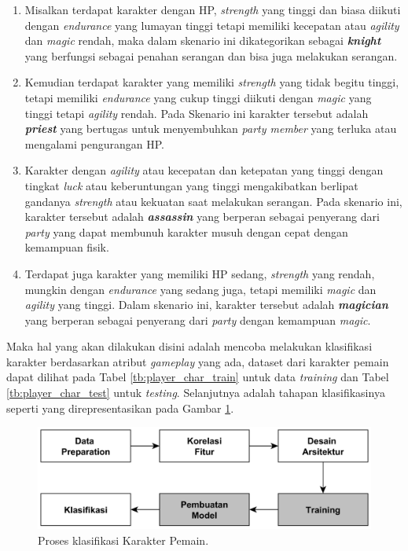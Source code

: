 \begin{enumerate}[label=\arabic*).]
	\item Misalkan terdapat karakter dengan HP, \textit{strength} yang tinggi dan biasa diikuti dengan \textit{endurance} yang lumayan tinggi tetapi memiliki kecepatan atau \textit{agility} dan \textit{magic} rendah, maka dalam skenario ini dikategorikan sebagai \textbf{\textit{knight}} yang berfungsi sebagai penahan serangan dan bisa juga melakukan serangan. 
	
	\item Kemudian terdapat karakter yang memiliki \textit{strength} yang tidak begitu tinggi, tetapi memiliki \textit{endurance} yang cukup tinggi diikuti dengan \textit{magic} yang tinggi tetapi \textit{agility} rendah. Pada Skenario ini karakter tersebut adalah \textbf{\textit{priest}} yang bertugas untuk menyembuhkan \textit{party member} yang terluka atau mengalami pengurangan HP. 
	
	\item Karakter dengan \textit{agility} atau kecepatan dan ketepatan yang tinggi dengan tingkat \textit{luck} atau keberuntungan yang tinggi mengakibatkan berlipat gandanya \textit{strength} atau kekuatan saat melakukan serangan. Pada skenario ini, karakter tersebut adalah \textbf{\textit{assassin}} yang berperan sebagai penyerang dari \textit{party} yang dapat membunuh karakter musuh dengan cepat dengan kemampuan fisik.
	
	\item Terdapat juga karakter yang memiliki HP sedang, \textit{strength} yang rendah, mungkin dengan \textit{endurance} yang sedang juga, tetapi memiliki \textit{magic} dan \textit{agility} yang tinggi. Dalam skenario ini, karakter tersebut adalah \textbf{\textit{magician}} yang berperan sebagai penyerang dari \textit{party} dengan kemampuan \textit{magic}.
\end{enumerate}

Maka hal yang akan dilakukan disini adalah mencoba melakukan klasifikasi karakter berdasarkan atribut \textit{gameplay} yang ada, dataset dari karakter pemain dapat dilihat pada Tabel \ref{tb:player_char_train} untuk data \textit{training} dan Tabel \ref{tb:player_char_test} untuk \textit{testing}. Selanjutnya adalah tahapan klasifikasinya seperti yang direpresentasikan pada Gambar \ref{fig:player_class_proc}. 
\vspace{1ex}

\begin{figure} [!h] \centering
	\includegraphics[scale=0.035]{img/player_char_nn_classification.png}
	\caption{Proses klasifikasi Karakter Pemain.}
	\label{fig:player_class_proc}
\end{figure}

